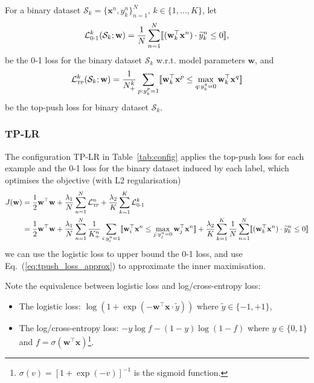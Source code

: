 \documentclass[9pt]{extarticle}
\newcommand{\llb}{\llbracket}
\newcommand{\rrb}{\rrbracket}
\newcommand{\x}{\mathbf{x}}
\newcommand{\1}{\mathbf{1}}
\newcommand{\w}{\mathbf{w}}
\newcommand{\LCal}{\mathcal{L}}
\newcommand{\SCal}{\mathcal{S}}
\begin{document}
For a binary dataset $\SCal_k = \{\x^n, y_k^n\}_{n=1}^N, \, k \in \{1,\dots,K\}$, let
\begin{equation}
\label{eq:log_loss_label}
\LCal_\textsc{0-1}^k(\SCal_k; \w) = \frac{1}{N} \sum_{n=1}^N \llb (\w_k^\top \x^n) \cdot \widetilde{y}_k^n \le 0 \rrb,
\end{equation}
be the 0-1 loss for the binary dataset $\SCal_k$ w.r.t. model parameters $\w$, and
\begin{equation}
\label{eq:tp_loss_label}
\LCal_\textsc{tp}^k(\SCal_k; \w) = \frac{1}{N_+^k} \sum_{p: y_k^p=1} \llb \w_k^\top \x^p \le \max_{q: y_k^q=0} \w_k^\top \x^q \rrb
\end{equation}
be the top-push loss for binary dataset $\SCal_k$.


\subsubsection{TP-LR}
\label{sssec:tp_lr}

The configuration TP-LR in Table~\ref{tab:config} applies the top-push loss for each example and 
the 0-1 loss for the binary dataset induced by each label, which optimises the objective (with L2 regularisation)
\begin{equation}
\label{eq:tp_lr_obj}
\begin{aligned}
J(\w)
&= \frac{1}{2} \w^\top \w +
   \frac{\lambda_1}{N} \sum_{n=1}^N \LCal_\textsc{tp}^n +
   \frac{\lambda_2}{K} \sum_{k=1}^K \LCal_\textsc{0-1}^k \\
&= \frac{1}{2} \w^\top \w +
   \frac{\lambda_1}{N} \sum_{n=1}^N \frac{1}{K_+^n} \sum_{i: y_i^n=1} \llb \w_i^\top \x^n \le \max_{j: y_j^n=0} \w_j^\top \x^n \rrb +
   \frac{\lambda_2}{K} \sum_{k=1}^K \frac{1}{N} \sum_{n=1}^N \llb (\w_k^\top \x^n) \cdot \widetilde{y}_k^n \le 0 \rrb %
\end{aligned}
\end{equation}
we can use the logistic loss to upper bound the 0-1 loss, and use Eq.~(\ref{eq:tpush_loss_approx}) to approximate the inner maximisation.

Note the equivalence between logistic loss and log/cross-entropy loss:
\begin{itemize}
\item The logistic loss: $\log(1 + \exp(-\w^\top \x \cdot \widetilde{y}))$ where $\widetilde{y} \in \{-1, +1\}$,
\item The log/cross-entropy loss: $ -y \log f - (1-y) \log(1-f)$ where $y \in \{0, 1\}$ and $f = \sigma(\w^\top \x)$\footnote{
$\sigma(v) = [1 + \exp(-v)]^{-1}$ is the sigmoid function.}.
\end{itemize}
\end{document}
